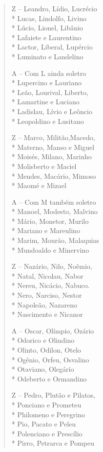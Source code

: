 \begin{verse}
Z -- Leandro, Lídio, Lucrécio\\*
Lucas, Lindolfo, Livino\\*
Lúcio, Lionel, Libânio\\*
Lafaiete e Laurentino\\*
Lactor, Liberal, Lupércio\\*
Luminato e Landelino

A -- Com L ainda soletro\\*
Lupercino e Lauriano\\*
Leão, Lourival, Liberto,\\*
Lamartine e Luciano\\*
Ladislau, Lívio e Leôncio\\*
Leopoldino e Lusitano

Z -- Marco, Militão,Macedo,\\*
Materno, Manso e Miguel\\*
Moisés, Milano, Marinho\\*
Molisberto e Maciel\\*
Mendes, Macário, Mimoso\\*
Maomé e Mizael

A -- Com M também soletro\\*
Manoel, Modesto, Malvino\\*
Mário, Monetor, Murilo\\*
Mariano e Mareulino\\*
Marim, Mourão, Malaquias\\*
Mundoaldo e Minervino

Z -- Nazário, Nilo, Noêmio,\\*
Natal, Nicolau, Nabor\\*
Nereu, Nicácio, Nabuco.\\*
Nero, Narciso, Nestor\\*
Napoleão, Nazareno\\*
Nascimento e Nicanor

A -- Oscar, Olímpio, Ozário\\*
Odorico e Olindino\\*
Olinto, Odilon, Otelo\\*
Ogênio, Orfeu, Osvalino\\*
Otaviano, Olegário\\*
Odeberto e Ormandino

Z -- Pedro, Plutão e Pilatos,\\*
Ponciano e Prometeu\\*
Philomeno e Peregrino\\*
Pio, Pacato e Peleu\\*
Polenciano e Prescílio\\*
Pirro, Petrarca e Pompeu


\end{verse}
